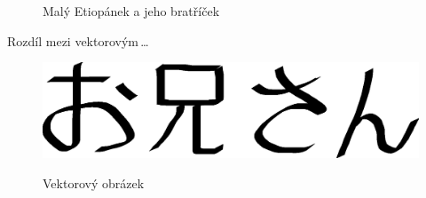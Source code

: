 \documentclass[a4paper, 11pt]{article}
\begin{document}
\begin{figure}[h]
\begin{center}
{     
  }
  \caption{Malý Etiopánek a jeho bratříček}
  \label{pic:obr1}
\end{center}
\end{figure}

\newpage

Rozdíl mezi vektorovým\,\ldots
\begin{figure}[h]
\begin{center}
  \scalebox{0.4}
  {
    \includegraphics{oniisan.eps}
  }
  \caption{Vektorový obrázek}
  \label{pic:obr2}
\end{center}
\end{figure}
\end{document}
